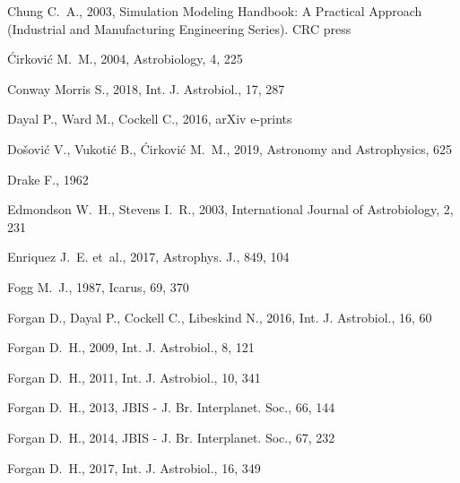 \documentclass[crop]{CSLB}
\begin{document}
\begin{thebibliography}{90}
Chung C.~A., 2003, {Simulation Modeling Handbook: A Practical Approach
  (Industrial and Manufacturing Engineering Series)}. CRC press

{\'{C}}irkovi{\'{c}} M.~M., 2004, Astrobiology, 4, 225

{Conway Morris} S., 2018, Int. J. Astrobiol., 17, 287

Dayal P., Ward M., Cockell C., 2016, arXiv e-prints

Do{\v{s}}ovi{\'{c}} V., Vukoti{\'{c}} B., {\'{C}}irkovi{\'{c}} M.~M., 2019,
  Astronomy and Astrophysics, 625

Drake F., 1962

Edmondson W.~H., Stevens I.~R., 2003, International Journal of Astrobiology, 2,
  231

Enriquez J.~E. {et~al.}, 2017, Astrophys. J., 849, 104

Fogg M.~J., 1987, Icarus, 69, 370

Forgan D., Dayal P., Cockell C., Libeskind N., 2016, Int. J. Astrobiol., 16, 60

Forgan D.~H., 2009, Int. J. Astrobiol., 8, 121

Forgan D.~H., 2011, Int. J. Astrobiol., 10, 341

Forgan D.~H., 2013, JBIS - J. Br. Interplanet. Soc., 66, 144

Forgan D.~H., 2014, JBIS - J. Br. Interplanet. Soc., 67, 232

Forgan D.~H., 2017{}, Int. J. Astrobiol., 16, 349


\end{thebibliography}
\end{document}
